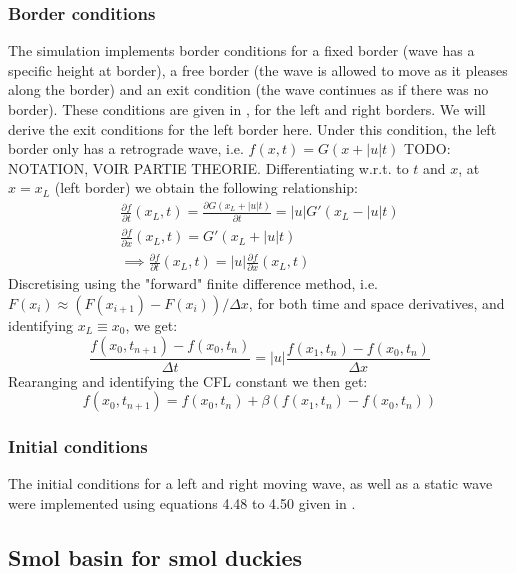 \subsubsection{Border conditions}

The simulation implements border conditions for a fixed border (wave has a specific height at border), a free border (the wave is allowed to move as it pleases along the border) and an exit condition (the wave continues as if there was no border). These conditions are given in \cite{physnumbook}, for the left and right borders. We will derive the exit conditions for the left border here. Under this condition, the left border only has a retrograde wave, i.e. \(f(x, t) = G(x + |u| t)\) TODO: NOTATION, VOIR PARTIE THEORIE. Differentiating w.r.t. to \(t\) and \(x\), at \(x = x_L\) (left border) we obtain the following relationship:
\begin{gather}
    \frac{\partial f}{\partial t}(x_L, t) = \frac{\partial G(x_L + |u| t)}{\partial t} = |u| G'(x_L - |u| t) \\
    \frac{\partial f}{\partial x}(x_L, t) = G'(x_L + |u| t) \\
    \implies \frac{\partial f}{\partial t}(x_L, t) = |u| \frac{\partial f}{\partial x}(x_L, t)
\end{gather}
Discretising using the "forward" finite difference method, i.e. \(F(x_i) \approx (F(x_{i+1}) - F(x_i))/\Delta x\), for both time and space derivatives, and identifying \(x_L \equiv x_0\), we get:
\begin{equation}
    \frac{f(x_0,t_{n+1}) - f(x_0, t_n)}{\Delta t} = |u| \frac{f(x_1, t_n) - f(x_0, t_n)}{\Delta x}
\end{equation}
Rearanging and identifying the CFL constant we then get:
\begin{equation}
    f(x_0, t_{n+1}) = f(x_0, t_n) + \beta \left( f(x_1, t_n) - f(x_0, t_n) \right)
\end{equation}

\subsubsection{Initial conditions}

The initial conditions for a left and right moving wave, as well as a static wave were implemented using equations 4.48 to 4.50 given in \cite{physnumbook}.

\subsection{Smol basin for smol duckies}

